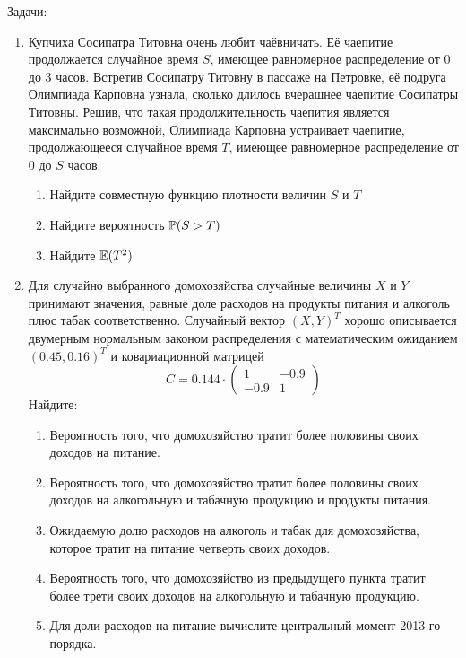 \documentclass[12pt, a4paper]{article}\usepackage[]{graphicx}\usepackage[]{color}
\begin{document}
Задачи:
\begin{enumerate}
\item Купчиха Сосипатра Титовна очень любит чаёвничать. Её чаепитие продолжается случайное время $S$, имеющее равномерное распределение от 0 до 3 часов.  Встретив Сосипатру Титовну в пассаже на Петровке, её подруга Олимпиада Карповна узнала, сколько длилось вчерашнее чаепитие Сосипатры Титовны. Решив, что такая продолжительность чаепития является максимально возможной, Олимпиада Карповна устраивает чаепитие, продолжающееся случайное время $T$, имеющее равномерное распределение от 0 до $S$ часов.
\begin{enumerate}
\item Найдите совместную функцию плотности величин $S$ и $T$
\item Найдите вероятность $\P(S>T)$
\item Найдите $\E(T^2)$
\end{enumerate}

\item  Для случайно выбранного домохозяйства случайные величины $X$ и $Y$ принимают значения, равные доле расходов на продукты питания и алкоголь плюс табак соответственно. Случайный вектор $(X,Y)^T$  хорошо описывается двумерным нормальным законом распределения с математическим ожиданием $(0.45, 0.16)^T$ и ковариационной матрицей
\[
C=0.144\cdot
\left(\begin{array}{cc}
1 & -0.9 \\
-0.9 & 1
\end{array}\right)
\]
Найдите:
\begin{enumerate}
\item Вероятность того, что домохозяйство тратит более половины своих доходов на питание.
\item Вероятность того, что домохозяйство тратит более половины своих доходов на алкогольную и табачную продукцию и продукты питания.
\item Ожидаемую долю расходов на алкоголь и табак для домохозяйства, которое тратит на питание четверть своих доходов.
\item Вероятность того, что домохозяйство из предыдущего пункта тратит более трети своих доходов на алкогольную и табачную продукцию.

\item Для доли расходов на питание вычислите центральный момент 2013-го порядка.


\end{enumerate}
\end{enumerate}
\end{document}
